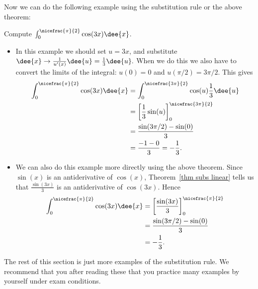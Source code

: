 Now we can do the following example using the substitution rule or the above theorem:
\begin{eg}\label{eg:substitution4}
Compute $\int_0^{\nicefrac{\pi}{2}}\cos(3x)\dee{x}$.

\begin{itemize}
 \item In this example we should set $u=3x$, and substitute $\dee{x} \rightarrow
\frac{1}{u'(x)}\dee{u} = \frac{1}{3}\dee{u}.$ When we do this we also have to convert
the limits of the integral: $u(0)=0$ and $u(\pi/2)=3\pi/2$. This gives
\begin{align*}
  \int_0^{\nicefrac{\pi}{2}}\cos(3x)\dee{x}
&= \int_0^{\nicefrac{3\pi}{2}} \cos(u) \frac{1}{3}\dee{u}\\
&= \left[\frac{1}{3} \sin(u) \right]_0^{\nicefrac{3\pi}{2}}\\
&= \frac{\sin(3\pi/2)-\sin(0)}{3}\\
&= \frac{-1-0}{3} = - \frac{1}{3}.
\end{align*}
\item We can also do this example more directly using the above theorem. Since $\sin(x)$
is an antiderivative of $\cos(x)$, Theorem~\ref{thm subs linear} tells us that
$\frac{\sin(3x)}{3}$ is an antiderivative of $\cos(3x)$. Hence
\begin{align*}
  \int_0^{\nicefrac{\pi}{2}}\cos(3x)\dee{x}
&= \left[ \frac{\sin(3x)}{3} \right]_0^{\nicefrac{\pi}{2}}\\
&= \frac{\sin(3\pi/2)-\sin(0)}{3}\\
&= -\frac{1}{3}.
\end{align*}
\end{itemize}

\end{eg}

The rest of this section is just more examples of the substitution rule. We recommend
that you after reading these that you practice many examples by yourself under exam
conditions.

